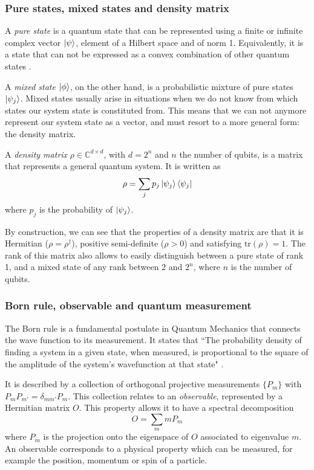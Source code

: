 \documentclass[12pt]{memoir}
\newcommand{\tr}{\text{tr}}
\begin{document}
\subsubsection*{Pure states, mixed states and density matrix}
A \textit{pure state} is a quantum state that can be represented using a finite or infinite complex vector $\ket \psi$, element of a Hilbert space and of norm 1. Equivalently, it is a state that can not be expressed as a convex combination of other quantum states \cite{wiki:density-matrix}.\medbreak

A \textit{mixed state} $\ket \phi$, on the other hand, is a probabilistic mixture of pure states $\ket {\psi_j}$. Mixed states usually arise in situations when we do not know from which states our system state is constituted from. This means that we can not anymore represent our system state as a vector, and must resort to a more general form: the density matrix.\medbreak

A \textit{density matrix} $\rho \in \mathbb{C}^{d \times d}$, with $d = 2^n$ and $n$ the number of qubits, is a matrix that represents a general quantum system. It is written as
\begin{equation}
    \rho = \sum_{j} p_j \ket{\psi_j} \bra{\psi_j}
\end{equation}
where $p_j$ is the probability of $\ket{\psi_j}$.\medbreak

By construction, we can see that the properties of a density matrix are that it is Hermitian ($\rho = \rho^{\dagger}$), positive semi-definite ($\rho > 0$) and satisfying $\tr(\rho) = 1$. The rank of this matrix also allows to easily distinguish between a pure state of rank 1, and a mixed state of any rank between 2 and $2^n$, where $n$ is the number of qubits.

\subsubsection*{Born rule, observable and quantum measurement}

The Born rule is a fundamental postulate in Quantum Mechanics that connects the wave function to its measurement. It states that ``The probability density of finding a system in a given state, when measured, is proportional to the square of the amplitude of the system's wavefunction at that state" \cite{wiki:born-rule}.\medbreak

It is described by a collection of orthogonal projective measurements $\{P_m\}$ with $P_mP_{m'}=\delta_{mm'}P_m$. This collection relates to an \textit{observable}, represented by a Hermitian matrix $O$. This property allows it to have a spectral decomposition
\begin{equation}
    O = \sum_m m P_m
\end{equation}
where $P_m$ is the projection onto the eigenspace of $O$ associated to eigenvalue $m$. An observable corresponds to a physical property which can be measured, for example the position, momentum or spin of a particle.\medbreak
\end{document}
